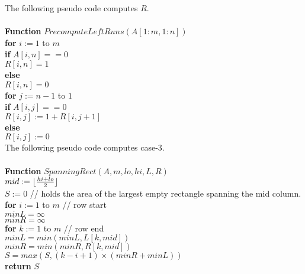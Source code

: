 \documentclass[11pt]{article}
\DeclarePairedDelimiter\floor{\lfloor}{\rfloor}
\begin{document}
The following pseudo code computes $R$.\\\\
\textbf{Function} $PrecomputeLeftRuns(A[1:m, 1:n])$\\
\-\hspace{2em} \textbf{for} $i := 1$ to $m$\\
\-\hspace{4em} \textbf{if} $A[i,n] == 0$\\
\-\hspace{6em} $R[i,n] = 1$\\
\-\hspace{4em} \textbf{else}\\
\-\hspace{6em} $R[i,n] = 0$\\
\-\hspace{4em} \textbf{for} $j := n-1$ to $1$\\
\-\hspace{6em} \textbf{if} $A[i,j] == 0$\\
\-\hspace{8em} $R[i,j] := 1 + R[i, j+1]$\\
\-\hspace{6em} \textbf{else}\\
\-\hspace{8em} $R[i,j] := 0$\\

The following pseudo code computes case-3.\\\\
\textbf{Function} $SpanningRect(A,m,lo,hi,L,R)$\\
\-\hspace{2em} $mid := \floor{\frac{hi+lo}{2}}$\\
\-\hspace{2em} $S := 0$ // holds the area of the largest empty
rectangle spanning the mid column.\\
\-\hspace{2em} \textbf{for} $i := 1$ to $m$ // row start\\
\-\hspace{4em} $minL = \infty$\\
\-\hspace{4em} $minR = \infty$\\
\-\hspace{4em} \textbf{for} $k := 1$ to $m$ // row end\\
\-\hspace{6em} $minL = min(minL, L[k,mid])$\\
\-\hspace{6em} $minR = min(minR, R[k,mid])$\\
\-\hspace{6em} $S = max(S, (k-i+1) \times (minR+minL))$\\
\-\hspace{2em} \textbf{return} $S$\\
\end{document}
